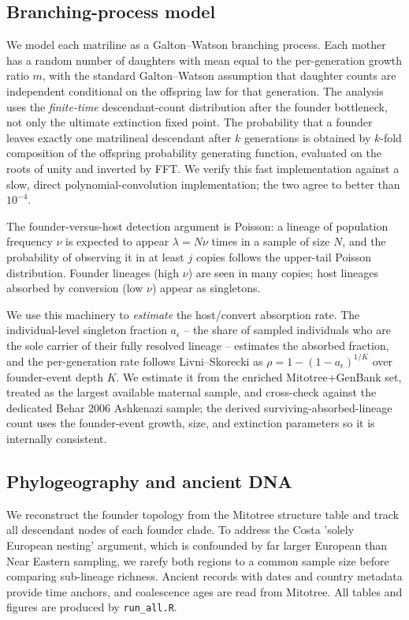 \documentclass[11pt]{article}
\begin{document}
\subsection{Branching-process model}
We model each matriline as a Galton--Watson branching process. Each mother has a random number of daughters with mean equal to the per-generation growth ratio $m$, with the standard Galton--Watson assumption that daughter counts are independent conditional on the offspring law for that generation. The analysis uses the \emph{finite-time} descendant-count distribution after the founder bottleneck, not only the ultimate extinction fixed point. The probability that a founder leaves exactly one matrilineal descendant after $k$ generations is obtained by $k$-fold composition of the offspring probability generating function, evaluated on the roots of unity and inverted by FFT. We verify this fast implementation against a slow, direct polynomial-convolution implementation; the two agree to better than $10^{-4}$.

The founder-versus-host detection argument is Poisson: a lineage of population frequency $\nu$ is expected to appear $\lambda = N\nu$ times in a sample of size $N$, and the probability of observing it in at least $j$ copies follows the upper-tail Poisson distribution. Founder lineages (high $\nu$) are seen in many copies; host lineages absorbed by conversion (low $\nu$) appear as singletons.

We use this machinery to \emph{estimate} the host/convert absorption rate. The individual-level singleton fraction $a_\epsilon$ -- the share of sampled individuals who are the sole carrier of their fully resolved lineage -- estimates the absorbed fraction, and the per-generation rate follows Livni--Skorecki as $\rho = 1 - (1-a_\epsilon)^{1/K}$ over founder-event depth $K$. We estimate it from the enriched Mitotree+GenBank set, treated as the largest available maternal sample, and cross-check against the dedicated Behar 2006 Ashkenazi sample; the derived surviving-absorbed-lineage count uses the founder-event growth, size, and extinction parameters so it is internally consistent.

\subsection{Phylogeography and ancient DNA}
We reconstruct the founder topology from the Mitotree structure table and track all descendant nodes of each founder clade. To address the Costa 'solely European nesting' argument, which is confounded by far larger European than Near Eastern sampling, we rarefy both regions to a common sample size before comparing sub-lineage richness. Ancient records with dates and country metadata provide time anchors, and coalescence ages are read from Mitotree. All tables and figures are produced by \texttt{run\_all.R}.
\end{document}

